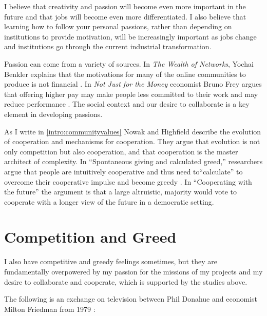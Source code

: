 I believe that creativity and passion will become even more important in the future and that jobs will become even more differentiated. I also believe that learning how to follow your personal passions, rather than depending on institutions to provide motivation, will be increasingly important as jobs change and institutions go through the current industrial transformation.

Passion can come from a variety of sources. In \emph{The Wealth of Networks}, Yochai Benkler explains that the motivations for many of the online communities to produce is not financial \cite{benkler2006wealth}. In \emph{Not Just for the Money} economist Bruno Frey argues that offering higher pay may make people less committed to their work and may reduce performance \cite{frey1997not}. The social context and our desire to collaborate is a key element in developing passions.

As I write in \autoref{intro:communityvalues} Nowak and Highfield describe the evolution of cooperation and mechanisms for cooperation. They argue that evolution is not only competition but also cooperation, and that cooperation is the master architect of complexity. In ``Spontaneous giving and calculated greed,'' researchers argue that people are intuitively cooperative and thus need to``calculate'' to overcome their cooperative impulse and become greedy \cite{rand2012spontaneous}. In ``Cooperating with the future'' \cite{hauser2014cooperating} the argument is that a large altruistic, majority would vote to cooperate with a longer view of the future in a democratic setting.

\section{Competition and Greed}

I also have competitive and greedy feelings sometimes, but they are fundamentally overpowered by my passion for the missions of my projects and my desire to collaborate and cooperate, which is supported by the studies above.

The following is an exchange on television between Phil Donahue and economist Milton Friedman from 1979 \cite{noauthor_notable_2015}:


